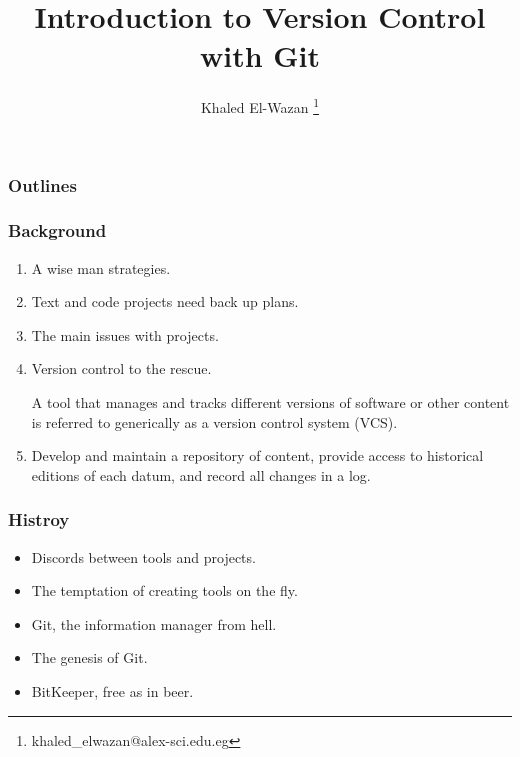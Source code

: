 \documentclass[22pt]{beamer}
\title{Introduction to Version Control with Git}
\author{Khaled El-Wazan \thanks{khaled\_elwazan@alex-sci.edu.eg}}
\institute{Department of Mathematics and Computer Science, Faculty of Science, Alexandria University}
\date{}
\begin{document}
\Large
\maketitle


\begin{frame}
    \frametitle{Outlines}
    \tableofcontents
\end{frame}


\begin{frame}
    \frametitle{Background}
    \begin{enumerate}
        \item A wise man strategies.
        \item Text and code projects need back up plans.
        \item The main issues with projects.
        \item Version control to the rescue.

              \pause
              \begin{definition}
                  A tool that manages and tracks different versions of software or other content is referred
                  to generically as a version control system (VCS).
              \end{definition}
              \pause
        \item Develop and maintain a repository of content, provide access to historical editions
              of each datum, and record all changes in a log.
    \end{enumerate}

\end{frame}


\begin{frame}
    \frametitle{Histroy}
    \begin{itemize}
        \item Discords between tools and projects.
        \item The temptation of creating tools on the fly.
        \item Git, the information manager from hell.
        \item The genesis of Git.
        \item BitKeeper, free as in beer.
    \end{itemize}


\end{frame}
\end{document}
